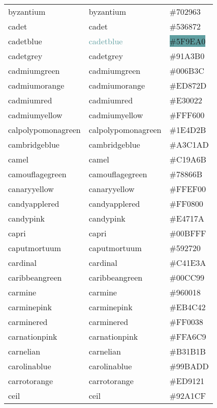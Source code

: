\documentclass[
]{article}
\begin{document}
\begin{longtable}[]{@{}lll@{}}
byzantium & \textcolor{byzantium}{byzantium} &
\colorbox{byzantium}{\#702963}\tabularnewline
cadet & \textcolor{cadet}{cadet} &
\colorbox{cadet}{\#536872}\tabularnewline
cadetblue & \textcolor{cadetblue}{cadetblue} &
\colorbox{cadetblue}{\#5F9EA0}\tabularnewline
cadetgrey & \textcolor{cadetgrey}{cadetgrey} &
\colorbox{cadetgrey}{\#91A3B0}\tabularnewline
cadmiumgreen & \textcolor{cadmiumgreen}{cadmiumgreen} &
\colorbox{cadmiumgreen}{\#006B3C}\tabularnewline
cadmiumorange & \textcolor{cadmiumorange}{cadmiumorange} &
\colorbox{cadmiumorange}{\#ED872D}\tabularnewline
cadmiumred & \textcolor{cadmiumred}{cadmiumred} &
\colorbox{cadmiumred}{\#E30022}\tabularnewline
cadmiumyellow & \textcolor{cadmiumyellow}{cadmiumyellow} &
\colorbox{cadmiumyellow}{\#FFF600}\tabularnewline
calpolypomonagreen & \textcolor{calpolypomonagreen}{calpolypomonagreen}
& \colorbox{calpolypomonagreen}{\#1E4D2B}\tabularnewline
cambridgeblue & \textcolor{cambridgeblue}{cambridgeblue} &
\colorbox{cambridgeblue}{\#A3C1AD}\tabularnewline
camel & \textcolor{camel}{camel} &
\colorbox{camel}{\#C19A6B}\tabularnewline
camouflagegreen & \textcolor{camouflagegreen}{camouflagegreen} &
\colorbox{camouflagegreen}{\#78866B}\tabularnewline
canaryyellow & \textcolor{canaryyellow}{canaryyellow} &
\colorbox{canaryyellow}{\#FFEF00}\tabularnewline
candyapplered & \textcolor{candyapplered}{candyapplered} &
\colorbox{candyapplered}{\#FF0800}\tabularnewline
candypink & \textcolor{candypink}{candypink} &
\colorbox{candypink}{\#E4717A}\tabularnewline
capri & \textcolor{capri}{capri} &
\colorbox{capri}{\#00BFFF}\tabularnewline
caputmortuum & \textcolor{caputmortuum}{caputmortuum} &
\colorbox{caputmortuum}{\#592720}\tabularnewline
cardinal & \textcolor{cardinal}{cardinal} &
\colorbox{cardinal}{\#C41E3A}\tabularnewline
caribbeangreen & \textcolor{caribbeangreen}{caribbeangreen} &
\colorbox{caribbeangreen}{\#00CC99}\tabularnewline
carmine & \textcolor{carmine}{carmine} &
\colorbox{carmine}{\#960018}\tabularnewline
carminepink & \textcolor{carminepink}{carminepink} &
\colorbox{carminepink}{\#EB4C42}\tabularnewline
carminered & \textcolor{carminered}{carminered} &
\colorbox{carminered}{\#FF0038}\tabularnewline
carnationpink & \textcolor{carnationpink}{carnationpink} &
\colorbox{carnationpink}{\#FFA6C9}\tabularnewline
carnelian & \textcolor{carnelian}{carnelian} &
\colorbox{carnelian}{\#B31B1B}\tabularnewline
carolinablue & \textcolor{carolinablue}{carolinablue} &
\colorbox{carolinablue}{\#99BADD}\tabularnewline
carrotorange & \textcolor{carrotorange}{carrotorange} &
\colorbox{carrotorange}{\#ED9121}\tabularnewline
ceil & \textcolor{ceil}{ceil} & \colorbox{ceil}{\#92A1CF}\tabularnewline

\end{longtable}
\end{document}
